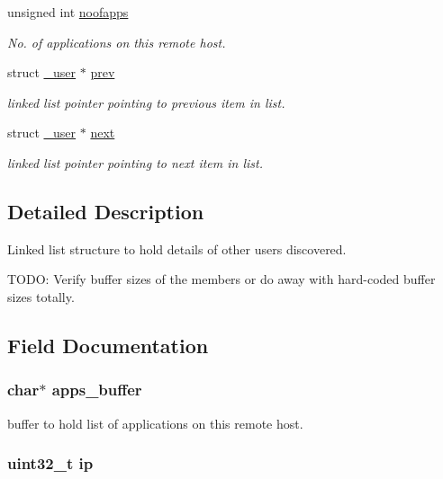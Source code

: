 \begin{DoxyCompactItemize}
unsigned int \hyperlink{struct__user_af1ec161713df6e2c66484fc4bdedd69e}{noofapps}
\begin{DoxyCompactList}\small\item\em \-No. of applications on this remote host. \end{DoxyCompactList}\item 
struct \hyperlink{struct__user}{\-\_\-user} $\ast$ \hyperlink{struct__user_a77ae9f3a44069973bbb7bffeff831ba9}{prev}
\begin{DoxyCompactList}\small\item\em linked list pointer pointing to previous item in list. \end{DoxyCompactList}\item 
struct \hyperlink{struct__user}{\-\_\-user} $\ast$ \hyperlink{struct__user_a8519a91a83c9b946512eaafe3b7a6c4b}{next}
\begin{DoxyCompactList}\small\item\em linked list pointer pointing to next item in list. \end{DoxyCompactList}\end{DoxyCompactItemize}


\subsection{\-Detailed \-Description}
\-Linked list structure to hold details of other users discovered. 

\-T\-O\-D\-O\-: \-Verify buffer sizes of the members or do away with hard-\/coded buffer sizes totally. 

\subsection{\-Field \-Documentation}
\hypertarget{struct__user_af76725a970e53676ee8ec7c0f83804d0}{
\subsubsection[{apps\-\_\-buffer}]{\setlength{\rightskip}{0pt plus 5cm}char$\ast$ {\bf apps\-\_\-buffer}}}\label{struct__user_af76725a970e53676ee8ec7c0f83804d0}


buffer to hold list of applications on this remote host. 

\hypertarget{struct__user_a69ddb9c845da426f636d9dd0dbed4e7e}{
\subsubsection[{ip}]{\setlength{\rightskip}{0pt plus 5cm}uint32\-\_\-t {\bf ip}}}\label{struct__user_a69ddb9c845da426f636d9dd0dbed4e7e}


